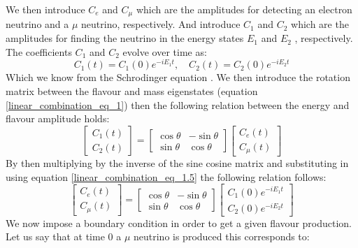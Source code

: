 We then introduce $C_e$ and $C_\mu$ which are the amplitudes for detecting an electron neutrino and a $\mu$ neutrino, respectively. And introduce $C_1$ and $C_2$ which are the amplitudes for finding the neutrino in the energy states $E_1$ and $E_2$ , respectively. The coefficients $C_1$ and $C_2$ evolve over time as:
\begin{equation}
    C_1(t) = C_1(0)e^{-iE_1t}, \quad  C_2(t) = C_2(0)e^{-iE_2t}
    \label{linear_combination_eq_1.5}
\end{equation}
Which we know from the Schrodinger equation \cite{sassaroli1999neutrino} \cite{griffiths2008book}\cite{griffiths2008neutrinoOscillations}. We then introduce the rotation matrix between the flavour and mass eigenstates (equation \ref{linear_combination_eq_1}) then the following relation between the energy and flavour amplitude holds:
\begin{equation}
    \begin{bmatrix}
        C_1(t) \\
        C_2(t)
    \end{bmatrix}
    =
    \begin{bmatrix}
        \cos\theta & -\sin\theta \\
        \sin\theta & \cos\theta 
    \end{bmatrix}
        \begin{bmatrix}
        C_e(t) \\
        C_\mu(t)
    \end{bmatrix}
    \label{linear_combination_eq_2}
\end{equation}
By then multiplying by the inverse of the sine cosine matrix and substituting in using equation \ref{linear_combination_eq_1.5} the following relation follows:
\begin{equation}
    \begin{bmatrix}
        C_e(t) \\
        C_\mu(t)
    \end{bmatrix}
    =
    \begin{bmatrix}
        \cos\theta & -\sin\theta \\
        \sin\theta & \cos\theta 
    \end{bmatrix}
        \begin{bmatrix}
        C_1(0)e^{-iE_1t} \\
        C_2(0)e^{-iE_2t}
    \end{bmatrix}
    \label{linear_combination_eq_3}
\end{equation}
We now impose a boundary condition in order to get a given flavour production. Let us say that at time 0 a $\mu$ neutrino is produced this corresponds to:
